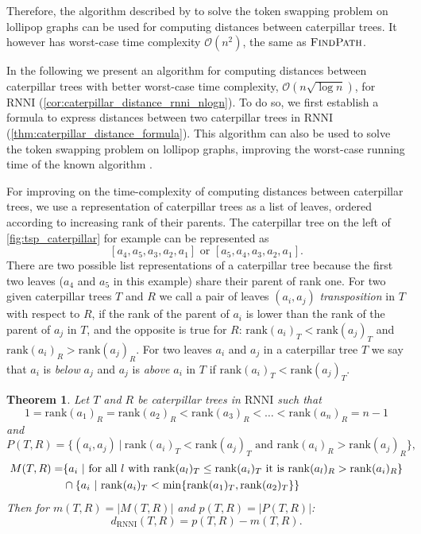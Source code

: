 \documentclass[11pt]{amsart}
\newtheorem{theorem}{Theorem}
\newcommand{\rnni}{\mathrm{RNNI}}
\newcommand{\findpath}{\textsc{FindPath}}
\newcommand{\rank}{\mathrm{rank}}
\renewcommand{\O}{\mathcal O}
\begin{document}
Therefore, the algorithm described by \textcite{Kawahara2017-ey} to solve the token swapping problem on lollipop graphs can be used for computing distances between caterpillar trees.
It however has worst-case time complexity $\O(n^2)$, the same as $\findpath$.

In the following we present an algorithm for computing distances between caterpillar trees with better worst-case time complexity, $\O(n \sqrt{\log n})$, for $\rnni$ (\autoref{cor:caterpillar_distance_rnni_nlogn}).
To do so, we first establish a formula to express distances between two caterpillar trees in $\rnni$ (\autoref{thm:caterpillar_distance_formula}).
This algorithm can also be used to solve the token swapping problem on lollipop graphs, improving the worst-case running time of the known algorithm \autocite{Kawahara2017-ey}.

For improving on the time-complexity of computing distances between caterpillar trees, we use a representation of caterpillar trees as a list of leaves, ordered according to increasing rank of their parents.
The caterpillar tree on the left of \autoref{fig:tsp_caterpillar} for example can be represented as 
\[[a_4,a_5,a_3,a_2,a_1] \text{ or }[a_5,a_4,a_3,a_2,a_1].\]
There are two possible list representations of a caterpillar tree because the first two leaves ($a_4$ and $a_5$ in this example) share their parent of rank one.
For two given caterpillar trees $T$ and $R$ we call a pair of leaves $(a_i,a_j)$ \emph{transposition} in $T$ with respect to $R$, if the rank of the parent of $a_i$ is lower than the rank of the parent of $a_j$ in $T$, and the opposite is true for $R$: $\rank(a_i)_T < \rank(a_j)_T$ and $\rank(a_i)_R > \rank(a_j)_R$.
For two leaves $a_i$ and $a_j$ in a caterpillar tree $T$ we say that $a_i$ is \emph{below} $a_j$ and $a_j$ is \emph{above} $a_i$ in $T$ if $\rank(a_i)_T < \rank(a_j)_T$.

\begin{theorem}
	\label{thm:caterpillar_distance_formula}
	Let $T$ and $R$ be caterpillar trees in $\rnni$ such that \[1 = \rank(a_1)_R = \rank(a_2)_R < \rank(a_3)_R < \ldots < \rank(a_n)_R = n-1\]
	and
	\[P(T,R) = \{(a_i,a_j)\ |\  \rank(a_i)_T < \rank(a_j)_T \text{ and } \rank(a_i)_R > \rank(a_j)_R\},\]
	\begin{align*}
		M(T,R) = &\{a_i\ |\  \textnormal{for all } l \textnormal{ with } \rank(a_l)_T \leq \rank(a_i)_T \textnormal{ it is } \rank(a_l)_R > \rank(a_i)_R\} \\
		& \cap \{a_i \ |\  \rank(a_i)_T < \min\{\rank(a_1)_T, \rank(a_2)_T\}\}
	\end{align*}
	Then for ${m(T,R) = |M(T,R)|}$ and ${p(T,R) = |P(T,R)|}$:
	\[d_{\rnni}(T,R) = p(T,R) - m(T,R).\]
\end{theorem}
\end{document}
